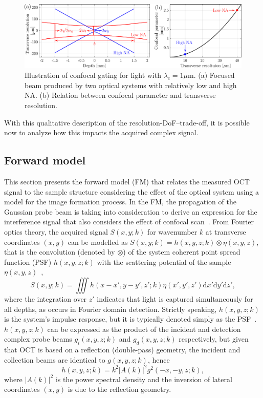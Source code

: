 \begin{figure}[htb!]
    \centering
    \includegraphics[width=\textwidth]{Figures/TheoreticalBasis/ConfocalScan.pdf}
    \caption[Illustration of confocal gating.]{Illustration of confocal gating for light with $\lambda_c = 1\mu$m. (a) Focused beam produced by two optical systems with relatively low and high NA. (b) Relation between confocal parameter and transverse resolution.}
    \label{fig:ConfocalScan}
\end{figure}

With this qualitative description of the resolution-DoF--trade-off, it is possible now to analyze how this impacts the acquired complex signal.

\subsection{Forward model}

This section presents the forward model (FM) that relates the measured OCT signal to the sample structure considering the effect of the optical system using a model for the image formation process. In the FM, the propagation of the Gaussian probe beam is taking into consideration to derive an expression for the interference signal that also considers the effect of confocal scan~\cite{Ralston2006_Inverse, Ralston2006_NonParaxial}. From Fourier optics theory, the acquired signal $S(x,y; k)$ for wavenumber $k$ at transverse coordinates $(x,y)$ can be modelled as $S(x,y; k)= h(x,y,z; k)\otimes\eta(x,y,z)$, that is the convolution (denoted by $\otimes$) of the system coherent point spread function (PSF) $h(x,y,z; k)$ with the scattering potential of the sample $\eta(x,y,z)$~\cite{Davis2007_Nonparaxial},
\begin{equation}\label{eq:conv}
    S(x,y; k) = \iiint h(x-x', y-y', z'; k) \eta(x',y',z') \text{d}x' \text{d}y' \text{d}z',
\end{equation}
where the integration over $z'$ indicates that light is captured simultaneously for all depths, as occurs in Fourier domain detection. Strictly speaking, $h(x,y,z; k)$ is the system's impulse response, but it is typically denoted simply as the PSF~\cite{Adie2015_Interferometric}. $h(x,y,z; k)$ can be expressed as the product of the incident and detection complex probe beams $g_i(x,y,z;k)$ and $g_d(x,y,z;k)$ respectively, but given that OCT is based on a reflection (double-pass) geometry, the incident and collection beams are identical to $g(x,y,z;k)$, hence~\cite{Ralston2006_Inverse}
\begin{equation}\label{eq:PSF1}
    h(x,y,z; k) =k^2|A(k)|^2g^2(-x, -y, z; k),
\end{equation}
where $|A(k)|^2$ is the power spectral density and the inversion of lateral coordinates $(x,y)$ is due to the reflection geometry.

